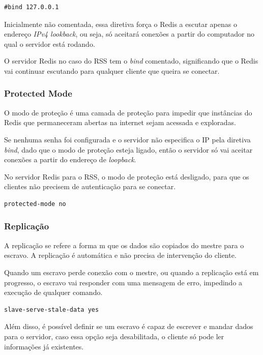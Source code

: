 \documentclass[10pt]{IEEEtran}
\begin{document}
\begin{lstlisting}[caption=Diretiva de conexão]
#bind 127.0.0.1
\end{lstlisting}

Inicialmente não comentada, essa diretiva força o Redis a escutar apenas o endereço \textit{IPv4 lookback}, ou seja, só aceitará conexões a partir do computador no qual o servidor está rodando.

O servidor Redis no caso do RSS tem o \textit{bind} comentado, significando que o Redis vai continuar escutando para qualquer cliente que queira se conectar.

\subsubsection{Protected Mode}

O modo de proteção é uma camada de proteção para impedir que instâncias do Redis que permaneceram abertas na internet sejam acessada e exploradas.

Se nenhuma senha foi configurada e o servidor não especifica o IP pela diretiva \textit{bind}, dado que o modo de proteção esteja ligado, então o servidor só vai aceitar conexões a partir do endereço de \textit{loopback}.

No servidor Redis para o RSS, o modo de proteção está desligado, para que os clientes não precisem de autenticação para se conectar.

\begin{lstlisting}[caption=Diretiva de proteção]
protected-mode no
\end{lstlisting}

\subsubsection{Replicação}

A replicação se refere a forma m que os dados são copiados do mestre para o escravo. A replicação é automática e não precisa de intervenção do cliente.

Quando um escravo perde conexão com o mestre, ou quando a replicação está em progresso, o escravo vai responder com uma mensagem de erro, impedindo a execução de qualquer comando.

\begin{lstlisting}[caption=Diretiva de replicação]
slave-serve-stale-data yes
\end{lstlisting}

Além disso, é possível definir se um escravo é capaz de escrever e mandar dados para o servidor, caso essa opção seja desabilitada, o cliente só pode ler informações já existentes.
\end{document}
